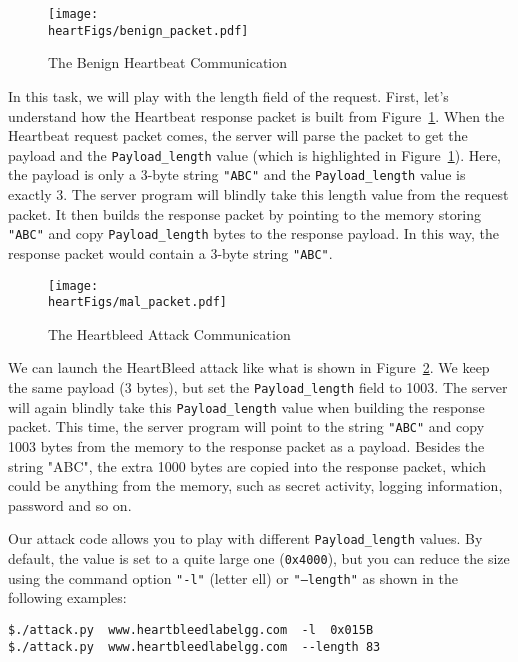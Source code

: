 \begin{figure}[htb]
\centering
\texttt{[image: \\heartFigs/benign\_packet.pdf]}
\caption{The Benign Heartbeat Communication} 
\label{fig:benign_packet}
\end{figure}

In this task, we will play with the length field of the request.
First, let's understand how the Heartbeat response packet is built from 
Figure~\ref{fig:benign_packet}. When the Heartbeat request packet comes,
the server will parse the packet to get the payload and
the \texttt{Payload\_length} value (which is highlighted in 
Figure~\ref{fig:benign_packet}). Here, the payload is only a 3-byte string
\texttt{"ABC"} and the \texttt{Payload\_length} value is exactly 3. The server program will
blindly take this length value from the request packet. It then builds
the response packet by pointing to the memory storing \texttt{"ABC"} and copy 
\texttt{Payload\_length} bytes to the response payload. In
this way, the response packet would contain a 3-byte string \texttt{"ABC"}.

\begin{figure}[!htb]
\centering
\texttt{[image: \\heartFigs/mal\_packet.pdf]}
\caption{The Heartbleed Attack Communication} 
\label{fig:mal_packet}
\end{figure}

We can launch the HeartBleed attack like what is shown in
Figure~\ref{fig:mal_packet}. We keep the same payload (3 bytes), but set
the \texttt{Payload\_length} field to 1003. The
server will again blindly take this \texttt{Payload\_length} value when building the response packet. This
time, the server program will point to the string \texttt{"ABC"} and copy 1003 bytes from the memory to
the response packet as a payload.  Besides the string "ABC", the extra 1000 bytes are copied
into the response packet, which could be anything from the memory, such as secret activity,
logging information, password and so on.



Our attack code allows
you to play with different \texttt{Payload\_length} values. By default, the
value is set to a quite large one (\texttt{0x4000}), but you can
reduce the size using the command option \texttt{"-l"} (letter ell)
or \texttt{"--length"} as shown in the following examples: 

\begin{lstlisting}
$./attack.py  www.heartbleedlabelgg.com  -l  0x015B 
$./attack.py  www.heartbleedlabelgg.com	 --length 83
\end{lstlisting}
 

